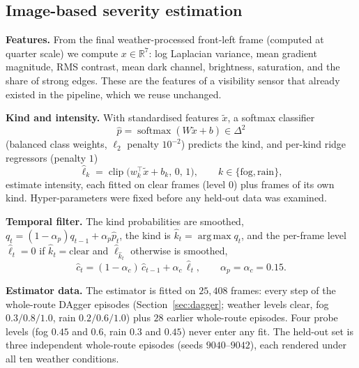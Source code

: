 \documentclass[conference]{IEEEtran}
\newcommand{\chat}{\hat{c}}
\DeclareMathOperator*{\argmax}{arg\,max}
\begin{document}
\subsection{Image-based severity estimation}
\label{sec:estimator}
\textbf{Features.} From the final weather-processed front-left frame (computed at quarter scale) we compute $x\in\mathbb R^7$: log Laplacian variance, mean gradient magnitude, RMS contrast, mean dark channel, brightness, saturation, and the share of strong edges. These are the features of a visibility sensor that already existed in the pipeline, which we reuse unchanged.

\textbf{Kind and intensity.} With standardised features $\tilde x$, a softmax classifier
\begin{equation}
\hat p=\operatorname{softmax}(W\tilde x+b)\in\Delta^2
\end{equation}
(balanced class weights, $\ell_2$ penalty $10^{-2}$) predicts the kind, and per-kind ridge regressors (penalty $1$)
\begin{equation}
\hat\ell_k=\operatorname{clip}\big(w_k^\top\tilde x+b_k,\,0,\,1\big),\qquad k\in\{\text{fog},\text{rain}\},
\end{equation}
estimate intensity, each fitted on clear frames (level $0$) plus frames of its own kind. Hyper-parameters were fixed before any held-out data was examined.

\textbf{Temporal filter.} The kind probabilities are smoothed, $q_t=(1-\alpha_p)q_{t-1}+\alpha_p\hat p_t$, the kind is $\hat k_t=\argmax q_t$, and the per-frame level $\hat\ell_t=0$ if $\hat k_t=\text{clear}$ and $\hat\ell_{\hat k_t}$ otherwise is smoothed,
\begin{equation}
\chat_t=(1-\alpha_c)\,\chat_{t-1}+\alpha_c\,\hat\ell_t,\qquad \alpha_p=\alpha_c=0.15 .
\end{equation}

\textbf{Estimator data.} The estimator is fitted on $25{,}408$ frames: every step of the whole-route DAgger episodes (Section~\ref{sec:dagger}; weather levels clear, fog $0.3/0.8/1.0$, rain $0.2/0.6/1.0$) plus $28$ earlier whole-route episodes. Four probe levels (fog $0.45$ and $0.6$, rain $0.3$ and $0.45$) never enter any fit. The held-out set is three independent whole-route episodes (seeds $9040$--$9042$), each rendered under all ten weather conditions.
\end{document}
